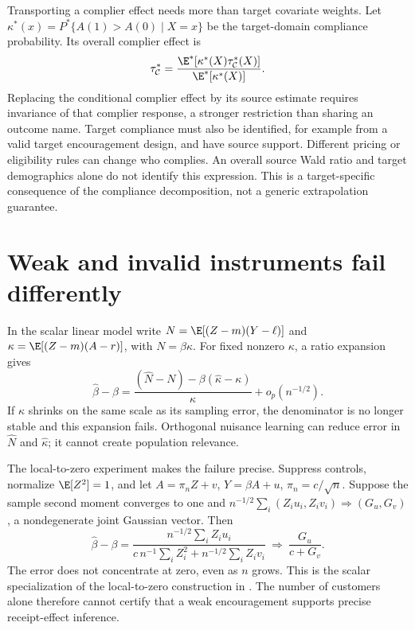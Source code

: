 Transporting a complier effect needs more than target covariate weights.
Let $\kappa^*(x)=P^*\{A(1)>A(0)\mid X=x\}$ be the target-domain
compliance probability. Its overall complier effect is
\[
 \tau_{\mathcal C}^*
 =\frac{\E^*[\kappa^*(X)\tau_{\mathcal C}^*(X)]}
        {\E^*[\kappa^*(X)]}.
\]
Replacing the conditional complier effect by its source estimate
requires invariance of that complier response, a stronger restriction
than sharing an outcome name. Target compliance must also be identified,
for example from a valid target encouragement design, and have source
support. Different pricing or eligibility rules can change who complies.
An overall source Wald ratio and target demographics alone do not
identify this expression. This is a target-specific consequence of the
compliance decomposition, not a generic extrapolation guarantee.

\section{Weak and invalid instruments fail differently}
\label{r3:weak-iv}
In the scalar linear model write $N=\E[(Z-m)(Y-\ell)]$ and
$\kappa=\E[(Z-m)(A-r)]$, with $N=\beta\kappa$.
For fixed nonzero $\kappa$, a ratio expansion gives
\[
 \widehat\beta-\beta
 =\frac{(\widehat N-N)-\beta(\widehat\kappa-\kappa)}{\kappa}
  +o_p(n^{-1/2}).
\]
If $\kappa$ shrinks on the same scale as its sampling error, the
denominator is no longer stable and this expansion fails. Orthogonal
nuisance learning can reduce error in $\widehat N$ and
$\widehat\kappa$; it cannot create population relevance.

The local-to-zero experiment makes the failure precise. Suppress controls,
normalize $\E[Z^2]=1$, and let
$A=\pi_n Z+v$, $Y=\beta A+u$, $\pi_n=c/\sqrt n$.
Suppose the sample second moment converges to one and
$n^{-1/2}\sum_i(Z_i u_i,Z_i v_i)\Rightarrow(G_u,G_v)$, a
nondegenerate joint Gaussian vector. Then
\begin{equation}
 \widehat\beta-\beta
 =\frac{n^{-1/2}\sum_i Z_i u_i}
 {c\,n^{-1}\sum_iZ_i^2+n^{-1/2}\sum_iZ_i v_i}
 \ \Longrightarrow\ \frac{G_u}{c+G_v}.
 \label{r3:weak-limit}
\end{equation}
The error does not concentrate at zero, even as $n$ grows. This is the
scalar specialization of the local-to-zero construction in
\citet[Section 2A, equations (2.4)--(2.7)]{staiger1994}. The number of
customers alone therefore cannot certify that a weak encouragement
supports precise receipt-effect inference.

